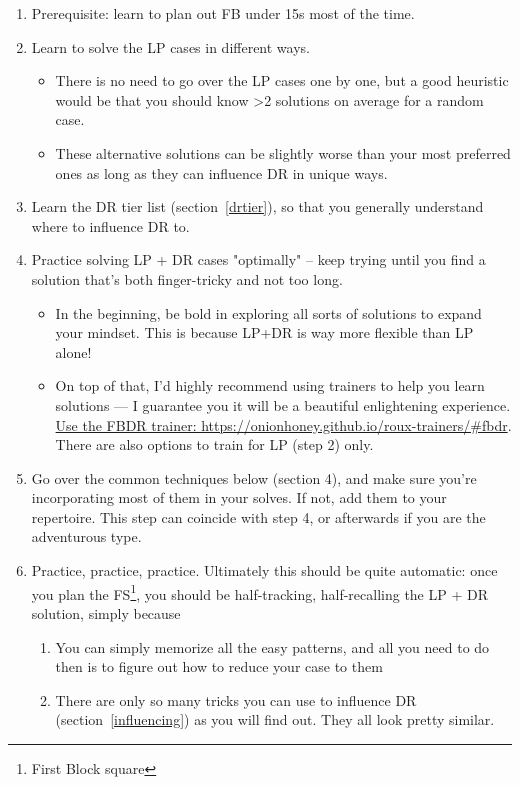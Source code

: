 \documentclass[12pt,letter]{article}
\begin{document}
\begin{enumerate}
    \item Prerequisite: learn to plan out FB under 15s most of the time.
    \item Learn to solve the LP cases in different ways.
    \begin{itemize}
        \item There is no need to go over the LP cases one by one, but a good heuristic would be that you should know \textgreater 2 solutions on average for a random case.
        \item These alternative solutions can be slightly worse than your most preferred ones as long as they can influence DR in unique ways. 
    \end{itemize}
    \item Learn the DR tier list (section~\ref{drtier}), so that you generally understand where to influence DR to.
    \item Practice solving LP + DR cases "optimally" -- keep trying until you find a solution that's both finger-tricky and not too long. 
    \begin{itemize}
    \item In the beginning, be bold in exploring all sorts of solutions to expand your mindset. This is because LP+DR is way more flexible than LP alone! 
        \item On top of that, I'd highly recommend using trainers to help you learn solutions --- I guarantee you it will be a beautiful enlightening experience. \href{https://onionhoney.github.io/roux-trainers/#fbdr}{Use the FBDR trainer: https://onionhoney.github.io/roux-trainers/\#fbdr}. There are also options to train for LP (step 2) only.
    \end{itemize}
    \item Go over the common techniques below (section 4), and make sure you’re incorporating most of them in your solves. If not, add them to your repertoire. This step can coincide with step 4, or afterwards if you are the adventurous type.
    \item Practice, practice, practice. Ultimately this should be quite automatic: once you plan the FS\footnote{First Block square}, you should be half-tracking, half-recalling the LP + DR solution, simply because 
    \begin{enumerate}
        \item You can simply memorize all the easy patterns, and all you need to do then is to figure out how to reduce your case to them
        \item There are only so many tricks you can use to influence DR (section~\ref{influencing}) as you will find out. They all look pretty similar.
    \end{enumerate}
\end{enumerate}
\end{document}
